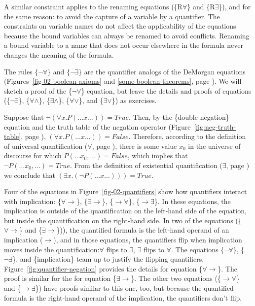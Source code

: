 {{A similar constraint applies to the renaming
equations (\{R$\forall$\} and \{R$\exists$\}),
and for the same reason: to avoid the
capture of a variable by a quantifier.
The constraints on variable names do not affect the applicability of
the equations because the bound variables can
always be renamed to avoid conflicts.
Renaming a bound variable to a name that does
not occur elsewhere in the formula never changes
the meaning of the formula.

\label{why-neg-forall}The
rules $\{\neg\forall\}$ and $\{\neg\exists\}$
are the quantifier analogs of the DeMorgan equations
(Figures~\ref{fig-02-boolean-axioms} and \ref{some-boolean-theorems}, page \pageref{some-boolean-theorems}).
We will sketch a proof of the \{$\neg\forall$\} equation,
but leave the details and proofs of equations
(\{$\neg\exists$\}, \{$\forall\wedge$\},
\{$\exists\wedge$\}, \{$\forall\vee$\}, and \{$\exists\vee$\}) as exercises.

Suppose that $\neg(\forall x.P(\dots x \dots)) = True$.
Then, by the \{double negation\} equation and the truth table of the negation operator
(Figure~\ref{fig:neg-truth-table}, page \pageref{fig:neg-truth-table}),
$(\forall x.P(\dots x \dots)) = False$.
Therefore, according to the definition of universal quantification
($\forall$, page \pageref{def:universal-quantifier}),
there is some value $x_0$ in the universe of discourse for which
$P(\dots x_0, \dots)=False$, which implies that
$\neg P(\dots x_0, \dots)=True$.
From the definition of existential quantification
($\exists$, page \pageref{def:existential-quantifier})
we conclude that $(\exists x.(\neg P(\dots x \dots))) = True$.

Four of the equations in Figure~\ref{fig-02-quantifiers}
show how quantifiers interact with implication:
\{${\forall}{\rightarrow}$\},
\{${\exists}{\rightarrow}$\},
\{${\rightarrow}{\forall}$\},
\{${\rightarrow}{\exists}$\}.
In these equations, the implication is outside of the quantification
on the left-hand side of the equation, but inside the quantification
on the right-hand side.
In two of the equations (\{${\forall}{\rightarrow}$\} and \{${\exists}{\rightarrow}$\})),
the quantified formula is the left-hand operand of an implication ($\rightarrow$),
and in those equations, the quantifiers flip when implication moves inside
the quantification:$\forall$ flips to $\exists$, $\exists$ flips to $\forall$.
The equations \{$\neg\forall$\}, \{$\neg\exists$\}, and \{implication\}
team up to justify the flipping quantifiers.
Figure~\ref{fig:quantifier-negation} provides the details for
equation \{${\forall}{\rightarrow}$\}.
The proof is similar for the for equation \{${\exists}{\rightarrow}$\}.
The other two equations (\{${\rightarrow}{\forall}$\} and \{${\rightarrow}{\exists}$\})
have proofs similar to this one, too, but because the quantified
formula is the right-hand operand of the implication,
the quantifiers don't flip.

}}
